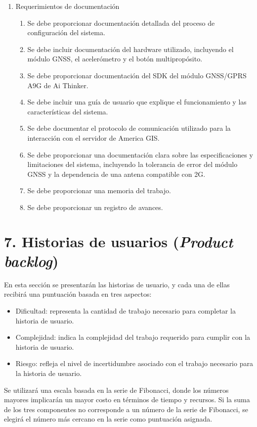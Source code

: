 \documentclass[
11pt, %
codirector, %
]{charter}
\begin{document}
\begin{enumerate}
\item Requerimientos de documentación
    \begin{enumerate}
    \item Se debe proporcionar documentación detallada del proceso de configuración del sistema.
    \item Se debe incluir documentación del hardware utilizado, incluyendo el módulo GNSS, el acelerómetro y el botón multipropósito.
    \item Se debe proporcionar documentación del SDK del módulo GNSS/GPRS A9G de Ai Thinker.
    \item Se debe incluir una guía de usuario que explique el funcionamiento y las características del sistema.
    \item Se debe documentar el protocolo de comunicación utilizado para la interacción con el servidor de America GIS.
    \item Se debe proporcionar una documentación clara sobre las especificaciones y limitaciones del sistema, incluyendo la tolerancia de error del módulo GNSS y la dependencia de una antena compatible con 2G.
    \item Se debe proporcionar una memoria del trabajo.
    \item Se debe proporcionar un registro de avances.
    \end{enumerate}
\end{enumerate}

\section{7. Historias de usuarios (\textit{Product backlog})}
\label{sec:backlog}

En esta sección se presentarán las historias de usuario, y cada una de ellas recibirá una puntuación basada en tres aspectos:
\begin{itemize}
 \item Dificultad: representa la cantidad de trabajo necesario para completar la historia de usuario.
 \item Complejidad: indica la complejidad del trabajo requerido para cumplir con la historia de usuario.
 \item Riesgo: refleja el nivel de incertidumbre asociado con el trabajo necesario para la historia de usuario.
\end{itemize}
Se utilizará una escala basada en la serie de Fibonacci, donde los números mayores implicarán un mayor costo en términos de tiempo y recursos. Si la suma de los tres componentes no corresponde a un número de la serie de Fibonacci, se elegirá el número más cercano en la serie como puntuación asignada.
\end{document}
